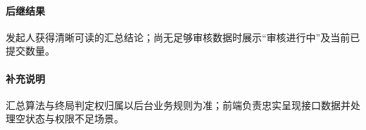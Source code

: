 \paragraph*{后继结果}

发起人获得清晰可读的汇总结论；尚无足够审核数据时展示“审核进行中”及当前已提交数量。

\paragraph*{补充说明}

汇总算法与终局判定权归属以后台业务规则为准；前端负责忠实呈现接口数据并处理空状态与权限不足场景。
